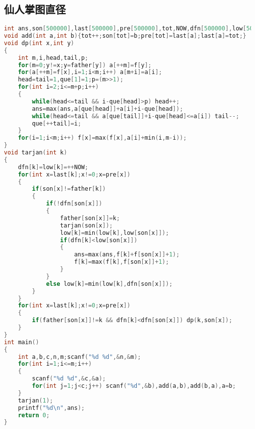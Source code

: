 \subsection{仙人掌图直径}
    \begin{lstlisting}[language=c++]
int ans,son[500000],last[500000],pre[500000],tot,NOW,dfn[500000],low[500000],a[500000],f[500000],father[500000],que[500000];
void add(int a,int b){tot++;son[tot]=b;pre[tot]=last[a];last[a]=tot;}
void dp(int x,int y)
{
	int m,i,head,tail,p;
	for(m=0;y!=x;y=father[y]) a[++m]=f[y];
	for(a[++m]=f[x],i=1;i<m;i++) a[m+i]=a[i];
	head=tail=1,que[1]=1;p=(m>>1);
	for(int i=2;i<=m+p;i++)
	{
		while(head<=tail && i-que[head]>p) head++;
		ans=max(ans,a[que[head]]+a[i]+i-que[head]);
		while(head<=tail && a[que[tail]]+i-que[head]<=a[i]) tail--;
		que[++tail]=i;	
	}	
	for(i=1;i<m;i++) f[x]=max(f[x],a[i]+min(i,m-i)); 
}
void tarjan(int k)
{
	dfn[k]=low[k]=++NOW;
	for(int x=last[k];x!=0;x=pre[x])
	{
		if(son[x]!=father[k])
		{
			if(!dfn[son[x]])
			{
				father[son[x]]=k;
				tarjan(son[x]);
				low[k]=min(low[k],low[son[x]]);
				if(dfn[k]<low[son[x]])
				{
					ans=max(ans,f[k]+f[son[x]]+1);
					f[k]=max(f[k],f[son[x]]+1);	
				}
			}	
			else low[k]=min(low[k],dfn[son[x]]);
		}	
	}	
	for(int x=last[k];x!=0;x=pre[x])
	{
		if(father[son[x]]!=k && dfn[k]<dfn[son[x]]) dp(k,son[x]);	
	}
}
int main()
{
	int a,b,c,n,m;scanf("%d %d",&n,&m);
	for(int i=1;i<=m;i++) 
	{
		scanf("%d %d",&c,&a);
		for(int j=1;j<c;j++) scanf("%d",&b),add(a,b),add(b,a),a=b;
	}
	tarjan(1);
	printf("%d\n",ans);
	return 0;
}
    \end{lstlisting}
